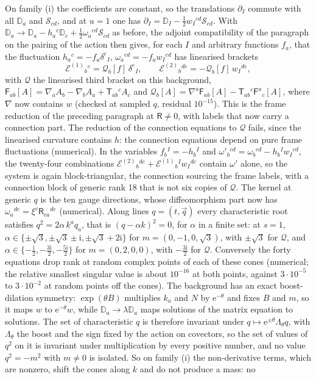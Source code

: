 On family (i) the coefficients are constant, so the translations \(\partial_I\) commute with all \(\mathbb D_a\) and \(\mathcal S_{cd}\), and at \(u=1\) one has \(\partial_I=\mathbb D_I-\tfrac12w_I{}^{cd}\mathcal S_{cd}\). With \(\mathbb D_a\to\mathbb D_a-h_a{}^c\mathbb D_c+\tfrac12\omega_a{}^{cd}\mathcal S_{cd}\) as before, the adjoint compatibility of the paragraph on the pairing of the action then gives, for each \(I\) and arbitrary functions \(f_a\), that the fluctuation \(h_a{}^c=-f_a\delta^c{}_I\), \(\omega_a{}^{cd}=-f_aw_I{}^{cd}\) has linearised brackets
\[
\mathcal E^{(1)}{}_b{}^e=\mathcal Q_b[f]\,\delta^e{}_I,\qquad
\mathcal E^{(2)}{}_b{}^{de}=-\mathcal Q_b[f]\,w_I{}^{de},
\]
with \(\mathcal Q\) the linearised third bracket on this background, \(\mathsf F_{ab}[A]=\nabla_aA_b-\nabla_bA_a+\mathsf T_{ab}{}^cA_c\) and \(\mathcal Q_b[A]=\nabla^a\mathsf F_{ab}[A]-\mathsf T_{ab}{}^c\mathsf F^a{}_c[A]\), where \(\nabla\) now contains \(w\) (checked at sampled \(q\), residual \(10^{-15}\)). This is the frame reduction of the preceding paragraph at \(\mathsf R\neq0\), with labels that now carry a connection part. The reduction of the connection equations to \(\mathcal Q\) fails, since the linearised curvature contains \(h\): the connection equations depend on pure frame fluctuations (numerical). In the variables \(f_b{}^I=-h_b{}^I\) and \(\omega'_b{}^{cd}=\omega_b{}^{cd}-h_b{}^Iw_I{}^{cd}\), the twenty-four combinations \(\mathcal E^{(2)}{}_b{}^{de}+\mathcal E^{(1)}{}_b{}^Iw_I{}^{de}\) contain \(\omega'\) alone, so the system is again block-triangular, the connection sourcing the frame labels, with a connection block of generic rank 18 that is not six copies of \(\mathcal Q\). The kernel at generic \(q\) is the ten gauge directions, whose diffeomorphism part now has \(\omega_a{}^{de}=\xi^c\mathsf R_{ca}{}^{de}\) (numerical). Along lines \(q=(t,\vec q)\) every characteristic root satisfies \(q^2=2\alpha\,k^aq_a\), that is \((q-\alpha k)^2=0\), for \(\alpha\) in a finite set: at \(s=1\), \(\alpha\in\{\pm\sqrt3,\pm\sqrt3\pm\mathrm i,\pm\sqrt3+2\mathrm i\}\) for \(m=(0,-1,0,\sqrt3)\), with \(\pm\sqrt3\) for \(\mathcal Q\), and \(\alpha\in\{-\tfrac{\mathrm i}2,-\tfrac{3\mathrm i}2,-\tfrac{5\mathrm i}2\}\) for \(m=(0,2,0,0)\), with \(-\tfrac{3\mathrm i}2\) for \(\mathcal Q\). Conversely the forty equations drop rank at random complex points of each of these cones (numerical; the relative smallest singular value is about \(10^{-16}\) at both points, against \(3\cdot10^{-5}\) to \(3\cdot10^{-2}\) at random points off the cones). The background has an exact boost-dilation symmetry: \(\exp(\theta B)\) multiplies \(k_a\) and \(N\) by \(\mathrm e^{-\theta}\) and fixes \(B\) and \(m\), so it maps \(w\) to \(\mathrm e^{-\theta}w\), while \(\mathbb D_a\to\lambda\mathbb D_a\) maps solutions of the matrix equation to solutions. The set of characteristic \(q\) is therefore invariant under \(q\mapsto\mathrm e^{\pm\theta}\Lambda_\theta q\), with \(\Lambda_\theta\) the boost and the sign fixed by the action on covectors, so the set of values of \(q^2\) on it is invariant under multiplication by every positive number, and no value \(q^2=-m^2\) with \(m\neq0\) is isolated. So on family (i) the non-derivative terms, which are nonzero, shift the cones along \(k\) and do not produce a mass: no 